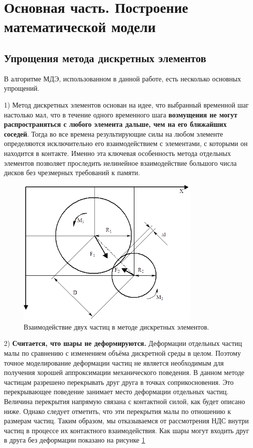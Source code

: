\documentclass[utf8x, 14pt, oneside, a4paper]{article}
\begin{document}
		\pagebreak

\section{Основная часть. Построение математической модели}

\subsection{Упрощения метода дискретных элементов}
В алгоритме МДЭ, использованном в данной работе, есть несколько основных упрощений. 

1) Метод дискретных элементов основан на идее, что выбранный временной шаг настолько мал, что в течение одного временного шага \textbf{возмущения не могут распространяться с любого элемента дальше, чем на его ближайших соседей}. 
Тогда во все времена результирующие силы на любом элементе определяются исключительно его взаимодействием с элементами, с которыми он находится в контакте.
Именно эта ключевая особенность метода отдельных элементов позволяет проследить нелинейное взаимодействие большого числа дисков без чрезмерных требований к памяти.

\begin{figure}[H]
	\centering
	\includegraphics[width=0.8\textwidth]{entry_pic}
	\caption{Взаимодействие двух частиц в методе дискретных элементов.}
	\label{pic:entry_pic}
\end{figure} 


2) \textbf{Считается, что шары не деформируются.}
Деформации отдельных частиц малы по сравнению с изменением объёма дискретной среды в целом.
Поэтому точное моделирование деформации частиц не является необходимым для получения хорошей аппроксимации механического поведения. 
В данном методе частицам разрешено перекрывать друг друга в точках соприкосновения. 
Это перекрывающее поведение занимает место деформации отдельных частиц. 
Величина перекрытия напрямую связана с контактной силой, как будет описано ниже.
Однако следует отметить, что эти перекрытия малы по отношению к размерам частиц.
Таким образом, мы отказываемся от рассмотрения НДС внутри частиц в процессе их контактного взаимодействия.
Как шары могут входить друг в друга без деформации показано на рисунке \ref{pic:entry_pic}
\end{document}
